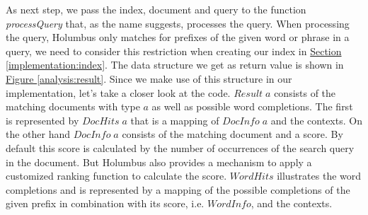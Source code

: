 \documentclass[%
	pdftex,%
	a4paper,%
	oneside,%
	chapterprefix,%
	headsepline,%
	12pt%
]{scrbook}
\newcommand{\Conid}[1]{\mathit{#1}}
\newcommand{\Varid}[1]{\mathit{#1}}
\begin{document}
As next step, we pass the index, document and query to the function
\emph{processQuery} that, as the name suggests, processes the
query. When processing the query, Holumbus only matches for prefixes
of the given word or phrase in a query, we need to consider this
restriction when creating our index in
\hyperref[implementation:index]{Section
  \ref{implementation:index}}. The data structure we get as return
value is shown in \hyperref[analysis:result]{Figure
  \ref{analysis:result}}. Since we make use of this structure in our
implementation, let's take a closer look at the code. \ensuremath{\Conid{Result}\;\Varid{a}}
consists of the matching documents with type \ensuremath{\Varid{a}} as well as possible
word completions. The first is represented by \ensuremath{\Conid{DocHits}\;\Varid{a}} that is a
mapping of \ensuremath{\Conid{DocInfo}\;\Varid{a}} and the contexts. On the other hand \ensuremath{\Conid{DocInfo}\;\Varid{a}}
consists of the matching document and a score. By default this score
is calculated by the number of occurrences of the search query in the
document. But Holumbus also provides a mechanism to apply a customized
ranking function to calculate the score. \ensuremath{\Conid{WordHits}} illustrates the
word completions and is represented by a mapping of the possible completions
of the given prefix in combination with its score, i.e. \ensuremath{\Conid{WordInfo}}, and the contexts.\\
\end{document}
